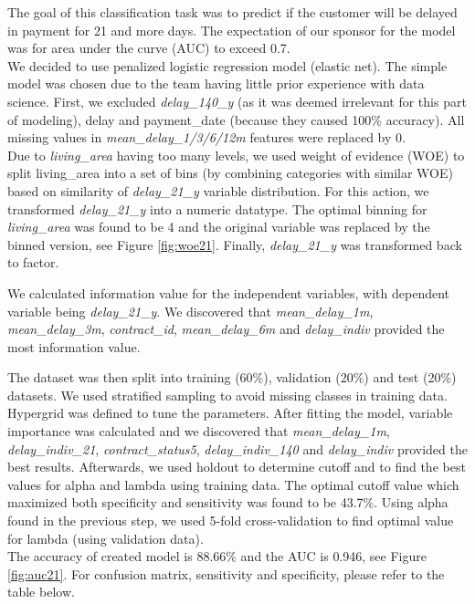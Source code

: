 \documentclass[
]{article}
\begin{document}
The goal of this classification task was to predict if the customer will be delayed in payment for 21 and more days. The expectation of our sponsor for the model was for area under the curve (AUC) to exceed 0.7.\\
We decided to use penalized logistic regression model (elastic net). The simple model was chosen due to the team having little prior experience with data science. First, we excluded \emph{delay\_140\_y} (as it was deemed irrelevant for this part of modeling), delay and payment\_date (because they caused 100\% accuracy). All missing values in \emph{mean\_delay\_1/3/6/12m} features were replaced by 0.\\
Due to \emph{living\_area} having too many levels, we used weight of evidence (WOE) to split living\_area into a set of bins (by combining categories with similar WOE) based on similarity of \emph{delay\_21\_y} variable distribution. For this action, we transformed \emph{delay\_21\_y} into a numeric datatype. The optimal binning for \emph{living\_area} was found to be 4 and the original variable was replaced by the binned version, see Figure \ref{fig:woe21}. Finally, \emph{delay\_21\_y} was transformed back to factor.

We calculated information value for the independent variables, with dependent variable being \emph{delay\_21\_y}. We discovered that \emph{mean\_delay\_1m}, \emph{mean\_delay\_3m}, \emph{contract\_id}, \emph{mean\_delay\_6m} and \emph{delay\_indiv} provided the most information value.

The dataset was then split into training (60\%), validation (20\%) and test (20\%) datasets. We used stratified sampling to avoid missing classes in training data.
Hypergrid was defined to tune the parameters. After fitting the model, variable importance was calculated and we discovered that \emph{mean\_delay\_1m}, \emph{delay\_indiv\_21}, \emph{contract\_status5}, \emph{delay\_indiv\_140} and \emph{delay\_indiv} provided the best results.
Afterwards, we used holdout to determine cutoff and to find the best values for alpha and lambda using training data. The optimal cutoff value which maximized both specificity and sensitivity was found to be 43.7\%. Using alpha found in the previous step, we used 5-fold cross-validation to find optimal value for lambda (using validation data).\\
The accuracy of created model is 88.66\% and the AUC is 0.946, see Figure \ref{fig:auc21}. For confusion matrix, sensitivity and specificity, please refer to the table below.
\end{document}
